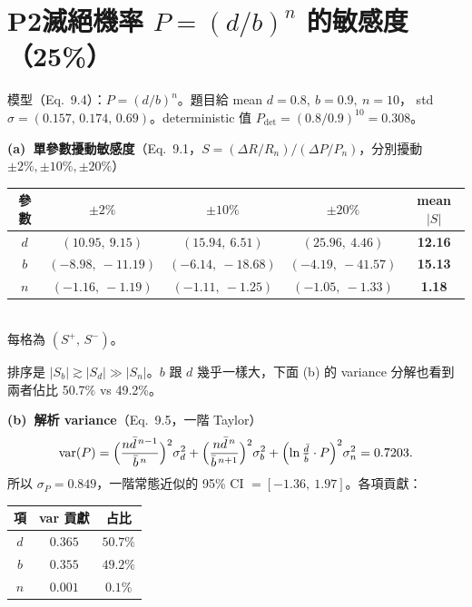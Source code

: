 \documentclass[11pt]{article}
\begin{document}
\section{P2\quad 滅絕機率 $P=(d/b)^{n}$ 的敏感度（25\%）}

模型（Eq.\ 9.4）：$P=(d/b)^{n}$。題目給 mean $d=0.8,\ b=0.9,\ n=10$，
std $\sigma=(0.157,\,0.174,\,0.69)$。deterministic 值
$P_{\text{det}}=(0.8/0.9)^{10}=0.308$。

\medskip
\textbf{(a)\ 單參數擾動敏感度}（Eq.\ 9.1，$S=(\Delta R/R_n)/(\Delta P/P_n)$，分別擾動 $\pm2\%,\pm10\%,\pm20\%$）

\begin{center}\small
\begin{tabular}{c c c c c}
\toprule
參數 & $\pm2\%$ & $\pm10\%$ & $\pm20\%$ & mean $|S|$\\
\midrule
$d$ & $(10.95,\ 9.15)$ & $(15.94,\ 6.51)$ & $(25.96,\ 4.46)$ & \textbf{12.16}\\
$b$ & $(-8.98,\ -11.19)$ & $(-6.14,\ -18.68)$ & $(-4.19,\ -41.57)$ & \textbf{15.13}\\
$n$ & $(-1.16,\ -1.19)$ & $(-1.11,\ -1.25)$ & $(-1.05,\ -1.33)$ & \textbf{1.18}\\
\bottomrule
\end{tabular}\\[2pt]
\footnotesize 每格為 $(S^{+},\,S^{-})$。
\end{center}

排序是 $|S_b|\gtrsim|S_d|\gg|S_n|$。$b$ 跟 $d$ 幾乎一樣大，下面 (b) 的 variance 分解也看到兩者佔比 50.7\% vs 49.2\%。

\medskip
\textbf{(b)\ 解析 variance}（Eq.\ 9.5，一階 Taylor）
\[
  \operatorname{var}(P)=\Bigl(\frac{n\bar d^{\,n-1}}{\bar b^{\,n}}\Bigr)^{2}\sigma_d^{2}
      +\Bigl(\frac{n\bar d^{\,n}}{\bar b^{\,n+1}}\Bigr)^{2}\sigma_b^{2}
      +\Bigl(\ln\tfrac{\bar d}{\bar b}\cdot P\Bigr)^{2}\sigma_n^{2}
  =0.7203.
\]
所以 $\sigma_P=0.849$，一階常態近似的 95\% CI $=[-1.36,\ 1.97]$。各項貢獻：

\begin{center}\small
\begin{tabular}{c c c}
\toprule
項 & var 貢獻 & 占比\\
\midrule
$d$ & $0.365$ & $50.7\%$\\
$b$ & $0.355$ & $49.2\%$\\
$n$ & $0.001$ & $0.1\%$\\
\bottomrule
\end{tabular}
\end{center}
\end{document}

